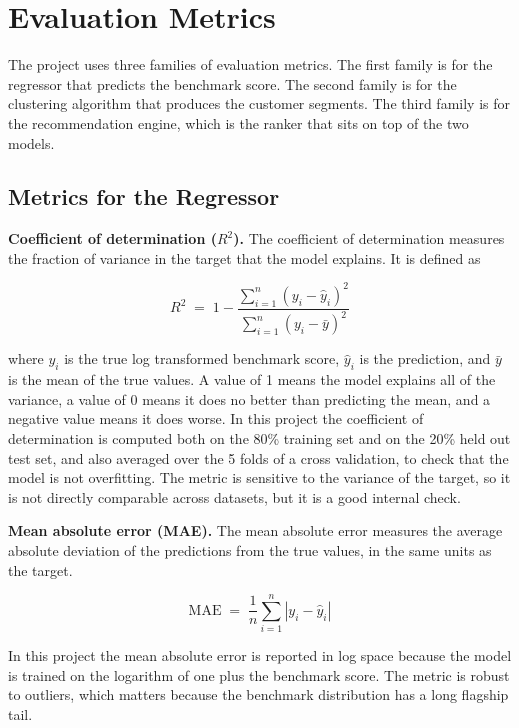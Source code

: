 \documentclass[12pt, a4paper]{report}
\numberwithin{figure}{chapter}
\numberwithin{table}{chapter}
\numberwithin{equation}{chapter}
\begin{document}
\section{Evaluation Metrics}

The project uses three families of evaluation metrics. The first family is for the regressor that predicts the benchmark score. The second family is for the clustering algorithm that produces the customer segments. The third family is for the recommendation engine, which is the ranker that sits on top of the two models. 
\subsection{Metrics for the Regressor}

\textbf{Coefficient of determination ($R^{2}$).} The coefficient of determination measures the fraction of variance in the target that the model explains. It is defined as

\begin{equation}
R^{2} \;=\; 1 - \frac{\sum_{i=1}^{n} \left( y_i - \hat{y}_i \right)^{2}}{\sum_{i=1}^{n} \left( y_i - \bar{y} \right)^{2}}
\label{eq:r2}
\end{equation}

\noindent where $y_i$ is the true log transformed benchmark score, $\hat{y}_i$ is the prediction, and $\bar{y}$ is the mean of the true values. A value of 1 means the model explains all of the variance, a value of 0 means it does no better than predicting the mean, and a negative value means it does worse. In this project the coefficient of determination is computed both on the 80\% training set and on the 20\% held out test set, and also averaged over the 5 folds of a cross validation, to check that the model is not overfitting. The metric is sensitive to the variance of the target, so it is not directly comparable across datasets, but it is a good internal check.

\textbf{Mean absolute error (MAE).} The mean absolute error measures the average absolute deviation of the predictions from the true values, in the same units as the target.

\begin{equation}
\text{MAE} \;=\; \frac{1}{n} \sum_{i=1}^{n} \left| y_i - \hat{y}_i \right|
\label{eq:mae}
\end{equation}

\noindent In this project the mean absolute error is reported in log space because the model is trained on the logarithm of one plus the benchmark score. The metric is robust to outliers, which matters because the benchmark distribution has a long flagship tail.
\end{document}
